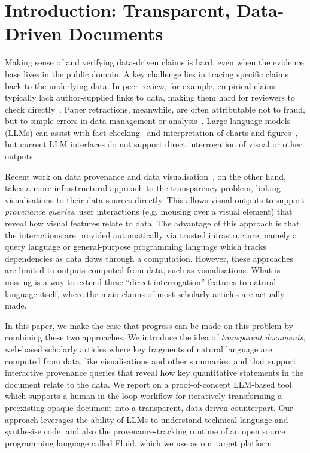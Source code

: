 \section{Introduction: Transparent, Data-Driven Documents}

Making sense of and verifying data-driven claims is hard, even when the evidence base lives in the public
domain. A key challenge lies in tracing specific claims back to the underlying data. In peer review, for
example, empirical claims typically lack author-supplied links to data, making them hard for reviewers to
check directly~\citep{weber20}. Paper retractions, meanwhile, are often attributable not to fraud, but to
simple errors in data management or analysis~\citep{hu25}. Large language models (LLMs) can assist with
fact-checking~\citep{abu-ahmad25} and interpretation of charts and figures~\citep{roberts24}, but current LLM
interfaces do not support direct interrogation of visual or other outputs.

Recent work on data provenance and data visualisation~\citep{psallidas18smoke,perera22,bond25}, on the other
hand, takes a more infrastructural approach to the transparency problem, linking visualisations to their data
sources directly. This allows visual outputs to support \emph{provenance queries}, user interactions (e.g.
mousing over a visual element) that reveal how visual features relate to data. The advantage of this approach
is that the interactions are provided automatically via trusted infrastructure, namely a query language or
general-purpose programming language which tracks dependencies as data flows through a computation. However,
these approaches are limited to outputs computed from data, such as visualisations. What is missing is a way
to extend these ``direct interrogation'' features to natural language itself, where the main claims of most
scholarly articles are actually made.

In this paper, we make the case that progress can be made on this problem by combining these two approaches.
We introduce the idea of \emph{transparent documents}, web-based scholarly articles where key fragments of
natural language are computed from data, like visualisations and other summaries, and that support interactive
provenance queries that reveal how key quantitative statements in the document relate to the data. We report
on a proof-of-concept LLM-based tool which supports a human-in-the-loop workflow for iteratively transforming
a preexisting opaque document into a transparent, data-driven counterpart. Our approach leverages the ability
of LLMs to understand technical language and synthesise code, and also the provenance-tracking runtime of an
open source programming language called Fluid, which we use as our target platform.

